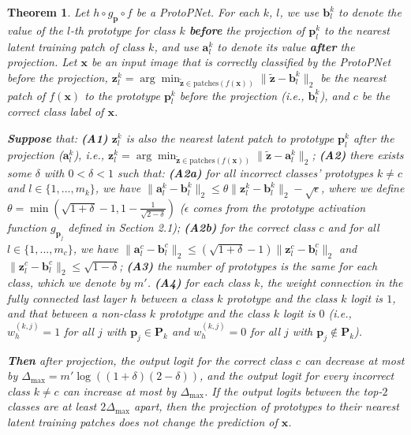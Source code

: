 \documentclass{article}
\newtheorem{thm}{Theorem}[section]
\theoremstyle{definition}
\theoremstyle{remark}
\begin{document}
\begin{thm}
Let $h \circ g_{\mathbf{p}} \circ f$ be a ProtoPNet. For each $k$, $l$, we use $\mathbf{b}^k_l$ to denote the value of the $l$-th prototype for class $k$ \textbf{before} the projection of $\mathbf{p}^k_l$ to the nearest latent training patch of class $k$, and use $\mathbf{a}^k_l$ to denote its value \textbf{after} the projection. Let $\mathbf{x}$ be an input image that is correctly classified by the ProtoPNet before the projection, $\mathbf{z}^k_l = \arg\min_{\tilde{\mathbf{z}} \in \text{patches}(f(\mathbf{x}))} \|\tilde{\mathbf{z}} - \mathbf{b}^k_l\|_2$ be the nearest patch of $f(\mathbf{x})$ to the prototype $\mathbf{p}^k_l$ before the projection (i.e., $\mathbf{b}^k_l$), and $c$ be the correct class label of $\mathbf{x}$.

\textbf{Suppose} that:
\textbf{(A1)} $\mathbf{z}^k_l$ is also the nearest latent patch to prototype $\mathbf{p}^k_l$ after the projection ($\mathbf{a}^k_l$), i.e., $\mathbf{z}^k_l = \arg\min_{\tilde{\mathbf{z}} \in \text{patches}(f(\mathbf{x}))} \|\tilde{\mathbf{z}} - \mathbf{a}^k_l\|_2$;
\textbf{(A2)} there exists some $\delta$ with $0 < \delta < 1$ such that: \quad \textbf{(A2a)} for all incorrect classes' prototypes $k \neq c$ and $l \in \{1, ..., m_k\}$, we have $\|\mathbf{a}^k_l - \mathbf{b}^k_l\|_2 \leq \theta\|\mathbf{z}^k_l - \mathbf{b}^k_l\|_2 - \sqrt{\epsilon}$, where we define $\theta = \min\left(\sqrt{1 + \delta} - 1, 1 - \frac{1}{\sqrt{2 - \delta}}\right)$ ($\epsilon$ comes from the prototype activation function $g_{\mathbf{p}_j}$ defined in Section 2.1);
\textbf{(A2b)} for the correct class $c$ and for all $l \in \{1, ..., m_c\}$, we have $\|\mathbf{a}^c_l - \mathbf{b}^c_l\|_2 \leq (\sqrt{1 + \delta} - 1)\|\mathbf{z}^c_l - \mathbf{b}^c_l\|_2$ and $\|\mathbf{z}^c_l - \mathbf{b}^c_l\|_2 \leq \sqrt{1 - \delta}$;
\textbf{(A3)} the number of prototypes is the same for each class, which we denote by $m'$.
\textbf{(A4)} for each class $k$, the weight connection in the fully connected last layer $h$ between a class $k$ prototype and the class $k$ logit is $1$, and that between a non-class $k$ prototype and the class $k$ logit is $0$ (i.e., $w_h^{(k, j)} = 1$ for all $j$ with $\mathbf{p}_j \in \mathbf{P}_k$ and $w_h^{(k, j)} = 0$ for all $j$ with $\mathbf{p}_j \not\in \mathbf{P}_k$).

\textbf{Then} after projection, the output logit for the correct class $c$ can decrease at most by $\Delta_{\max} = m'\log((1 + \delta)(2 - \delta))$, and the output logit for every incorrect class $k \neq c$ can increase at most by $\Delta_{\max}$. If the output logits between the top-$2$ classes are at least $2\Delta_{\max}$ apart, then the projection of prototypes to their nearest latent training patches does not change the prediction of $\mathbf{x}$.
\end{thm}
\end{document}
